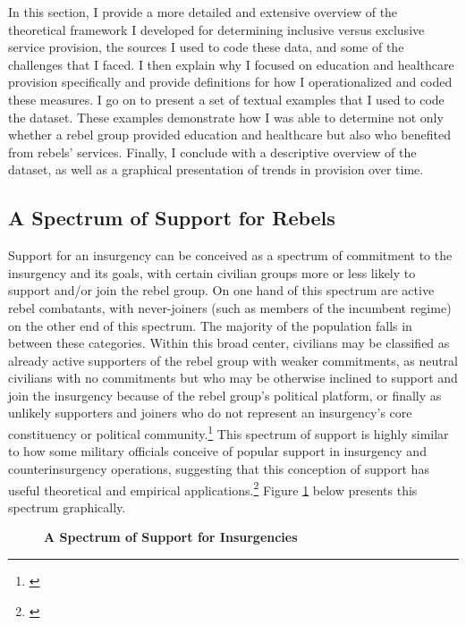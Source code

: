 \documentclass[12pt, letterpaper]{article}
\begin{document}
\normalsize

In this section, I provide a more detailed and extensive overview of the theoretical framework I developed for determining inclusive versus exclusive service provision, the sources I used to code these data, and some of the challenges that I faced. I then explain why I focused on education and healthcare provision specifically and provide definitions for how I operationalized and coded these measures. I go on to present a set of textual examples that I used to code the dataset. These examples demonstrate how I was able to determine not only whether a rebel group provided education and healthcare but also who benefited from rebels' services. Finally, I conclude with a descriptive overview of the dataset, as well as a graphical presentation of trends in provision over time.

\subsection*{A Spectrum of Support for Rebels}  

Support for an insurgency can be conceived as a spectrum of commitment to the insurgency and its goals, with certain civilian groups more or less likely to support and/or join the rebel group. On one hand of this spectrum are active rebel combatants, with never-joiners (such as members of the incumbent regime) on the other end of this spectrum. The majority of the population falls in between these categories. Within this broad center, civilians may be classified as already active supporters of the rebel group with weaker commitments, as neutral civilians with no commitments but who may be otherwise inclined to support and join the insurgency because of the rebel group's political platform, or finally as unlikely supporters and joiners who do not represent an insurgency's core constituency or political community.\footnote{\citealt{stewart2015good}} This spectrum of support is highly similar to how some military officials conceive of popular support in insurgency and counterinsurgency operations, suggesting that this conception of support has useful theoretical and empirical applications.\footnote{\citealt[71-2]{packwood2009popular}} Figure \ref{figure:spectrumgen} below presents this spectrum graphically. 
 
\begin{figure}[h!]
\centering
\begin{center}
\renewcommand\thefigure{A.\arabic{figure}}
\caption{\textbf{A Spectrum of Support for Insurgencies}}
\label{figure:spectrumgen}
\end{center}
\end{figure}
\end{document}
